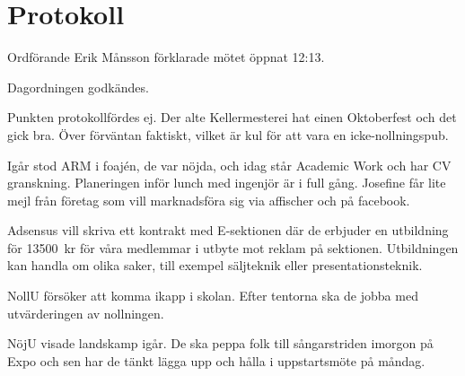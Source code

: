 \documentclass[10pt]{article}
\def\mo{Erik Månsson}
\begin{document}
\section*{Protokoll}
\begin{paragrafer}
Ordförande {\mo} förklarade mötet öppnat 12:13.

{\valavmo}

{\valavms}

{\valavj}

{\tosg}

{\ingaadj}


Dagordningen godkändes.


\begin{fyllnadsval} %
\end{fyllnadsval}

\begin{paragrafer}
Punkten protokollfördes ej.
Der alte Kellermesterei hat einen Oktoberfest och det gick bra. Över förväntan faktiskt, vilket är kul för att vara en icke-nollningspub.

Igår stod ARM i foajén, de var nöjda, och idag står Academic Work och har CV granskning. Planeringen inför lunch med ingenjör är i full gång. Josefine får lite mejl från företag som vill marknadsföra sig via affischer och på facebook.

Adsensus vill skriva ett kontrakt med E-sektionen där de erbjuder en utbildning för \SI{13500}{kr} för våra medlemmar i utbyte mot reklam på sektionen. Utbildningen kan handla om olika saker, till exempel säljteknik eller presentationsteknik.

NollU försöker att komma ikapp i skolan. Efter tentorna ska de jobba med utvärderingen av nollningen.

NöjU visade landskamp igår. De ska peppa folk till sångarstriden imorgon på Expo och sen har de tänkt lägga upp och hålla i uppstartsmöte på måndag.


\end{paragrafer}
\end{paragrafer}
\end{document}
